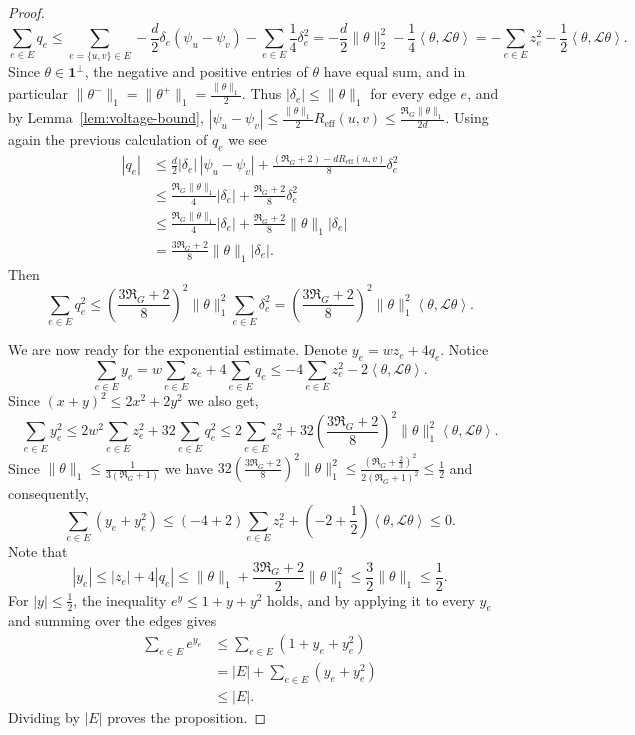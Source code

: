 \documentclass[10pt,a4paper]{amsart}
\newcommand{\ip}[2]{\left\langle #1,#2\right\rangle}
\begin{document}
\begin{proof}
\[
\sum_{e\in E}q_e
\le
\sum_{e=\{u,v\}\in E} -\frac d2  \delta_{e}(\psi_u-\psi_v)
-
\sum_{e\in E} \frac 1 4\delta_e^2
=
-\frac d2\|\theta\|_2^2
-
\frac14\ip{\theta}{\mathcal L\theta}
=
-
\sum_{e\in E}z_e^2
-
\frac12\ip{\theta}{\mathcal L\theta}.
\]
Since $\theta \in \mathbf 1^\perp$, the negative and positive entries of $\theta$ have equal sum, and in particular $\|\theta^-\|_1=\|\theta^+\|_1 = \frac{\|\theta\|_1}{2}$. Thus \(|\delta_e| \le \|\theta\|_1\) for every edge \(e\), and by Lemma~\ref{lem:voltage-bound},
\(
|\psi_u-\psi_v|\le
\frac{\|\theta\|_1}{2}R_{\mathrm{eff}}(u,v)
\le
\frac{\Re_G\|\theta\|_1}{2d}.
\)
Using again the previous calculation of $q_e$ we see
\[
\begin{aligned}
|q_e|
&\le
\frac d2|\delta_e|\,|\psi_u-\psi_v|
+
\frac{(\Re_G+2)-dR_{\mathrm{eff}}(u,v)}{8}\delta_e^2\\
&\le
\frac{\Re_G\|\theta\|_1}{4}|\delta_e|
+
\frac{\Re_G+2}{8}\delta_e^2\\
&\le
\frac{\Re_G\|\theta\|_1}{4}|\delta_e|
+
\frac{\Re_G+2}{8}\|\theta\|_1|\delta_e|\\
&=
\frac{3\Re_G+2}{8}
\|\theta\|_1|\delta_e|.
\end{aligned}
\]
Then
\[
\sum_{e\in E}q_e^2
\le
\left(\frac{3\Re_G+2}{8}\right)^2
\|\theta\|^2_1
\sum_{e\in E}\delta_e^2
=
\left(\frac{3\Re_G+2}{8}\right)^2
\|\theta\|^2_1
\ip{\theta}{\mathcal L\theta}.
\]

We are now ready for the exponential estimate. Denote \(y_e = wz_e+4q_e.\) Notice
\[
\sum_{e\in E}y_e
=
 w\sum_{e\in E}z_e
+
4\sum_{e\in E}q_e
\le
-4\sum_{e\in E}z_e^2
-
2\ip{\theta}{\mathcal L\theta}.
\]
Since \((x+y)^2\le2x^2+2y^2\) we also get,
\[
\sum_{e\in E}y_e^2
\le
2w^2\sum_{e\in E}z_e^2
+
32\sum_{e\in E}q_e^2
\le
2\sum_{e\in E}z_e^2
+32
\left(\frac{3\Re_G+2}{8}\right)^2
\|\theta\|^2_1
\ip{\theta}{\mathcal L\theta}.
\]
Since \(\|\theta\|_1 \le \frac 1{3(\Re_G+1)}\) we have 
\(
32 \left(\frac{3\Re_G+2}{8}\right)^2
\|\theta\|^2_1\le \frac{ (\Re_G+\frac23)^2}{2(\Re_G+1)^2}\le \frac12
\)
and consequently,
\[
\sum_{e\in E}(y_e+y_e^2)
\le
(-4+2)\sum_{e\in E}z_e^2
+
\left(
-2+\frac{1}{2}
\right)
\ip{\theta}{\mathcal L\theta}
\le
0.
\]
Note that
\[
|y_e|
\le
|z_e|+4|q_e|
\le
\|\theta\|_1+\frac{3\Re_G+2}{2} \|\theta\|_1^2
\le
\frac32 \|\theta\|_1\le
\frac12.
\]
For \(|y|\le \frac12\), the inequality \( e^y\le1+y+y^2 \) holds, and by applying it to every \(y_e\) and summing over the edges gives
\[
\begin{aligned}
\sum_{e\in E}e^{y_e}
&\le
\sum_{e\in E}(1+y_e+y_e^2)\\
&=
|E|+
\sum_{e\in E}(y_e+y_e^2)\\
&\le
|E|.
\end{aligned}
\]
Dividing by \(|E|\) proves the proposition.
\end{proof}
\end{document}

